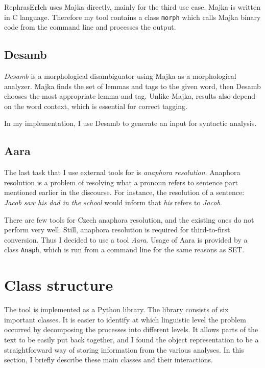 RephrasErIch uses Majka directly, mainly for the third use case. Majka is written in C language. Therefore my tool contains a class \texttt{morph} which calls Majka binary code from the command line and processes the output.

\subsection{Desamb}

\emph{Desamb} is a morphological disambiguator using Majka as a morphological analyzer. Majka finds the set of lemmas and tags to the given word, then Desamb chooses the most appropriate lemma and tag. Unlike Majka, results also depend on the word context, which is essential for correct tagging.

In my implementation, I use Desamb to generate an input for syntactic analysis.

\subsection{Aara}

The last task that I use external tools for is \emph{anaphora resolution}. Anaphora resolution is a problem of resolving what a pronoun refers to sentence part mentioned earlier in the discourse. For instance, the resolution of a sentence: \emph{Jacob saw his dad in the school} would inform that \emph{his} refers to \emph{Jacob}.

There are few tools for Czech anaphora resolution, and the existing ones do not perform very well. Still, anaphora resolution is required for third-to-first conversion. Thus I decided to use a tool \emph{Aara}. Usage of Aara is provided by a class \texttt{Anaph}, which is run from a command line for the same reasons as SET.

\section{Class structure}

The tool is implemented as a Python library. The library consists of six important classes. It is easier to identify at which linguistic level the problem occurred by decomposing the processes into different levels. It allows parts of the text to be easily put back together, and I found the object representation to be a straightforward way of storing information from the various analyses. In this section, I briefly describe these main classes and their interactions.

